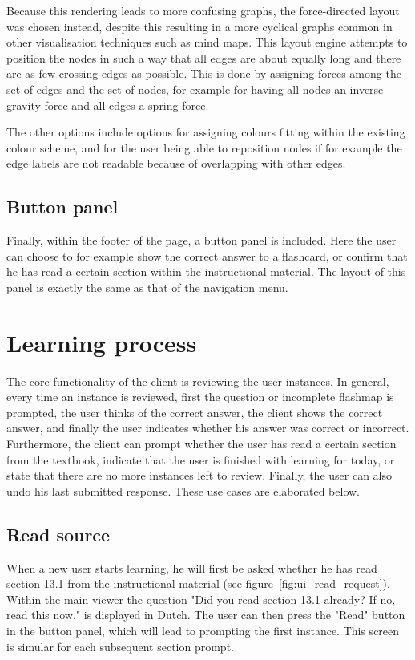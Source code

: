 Because this rendering leads to more confusing graphs, the force-directed layout was chosen instead, despite this resulting in a more cyclical graphs common in other visualisation techniques such as mind maps. This layout engine attempts to position the nodes in such a way that all edges are about equally long and there are as few crossing edges as possible. This is done by assigning forces among the set of edges and the set of nodes, for example for having all nodes an inverse gravity force and all edges a spring force.

The other options include options for assigning colours fitting within the existing colour scheme, and for the user being able to reposition nodes if for example the edge labels are not readable because of overlapping with other edges.

\subsection{Button panel}

Finally, within the footer of the page, a button panel is included. Here the user can choose to for example show the correct answer to a flashcard, or confirm that he has read a certain section within the instructional material. The layout of this panel is exactly the same as that of the navigation menu.

\section{Learning process}
\label{sec:client_learning}

The core functionality of the client is reviewing the user instances. In general, every time an instance is reviewed, first the question or incomplete flashmap is prompted, the user thinks of the correct answer, the client shows the correct answer, and finally the user indicates whether his answer was correct or incorrect. Furthermore, the client can prompt whether the user has read a certain section from the textbook, indicate that the user is finished with learning for today, or state that there are no more instances left to review. Finally, the user can also undo his last submitted response. These use cases are elaborated below.

\subsection{Read source}

When a new user starts learning, he will first be asked whether he has read section 13.1 from the instructional material (see figure~\ref{fig:ui_read_request}). Within the main viewer the question "Did you read section 13.1 already? If no, read this now." is displayed in Dutch. The user can then press the "Read" button in the button panel, which will lead to prompting the first instance. This screen is simular for each subsequent section prompt.

